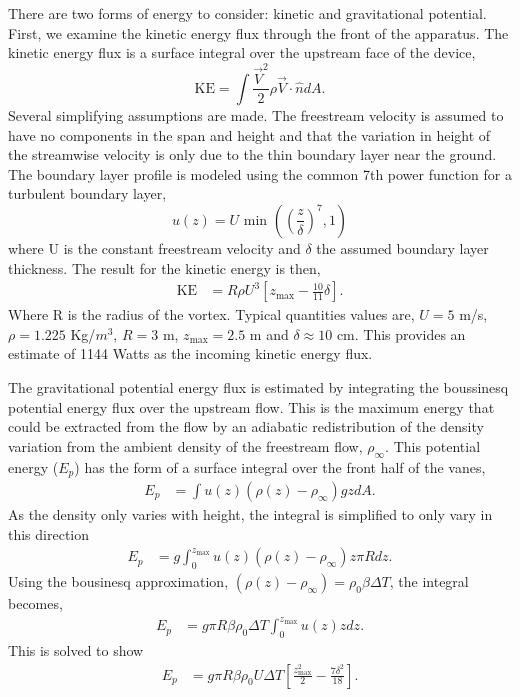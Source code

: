 There are two forms of energy to consider: kinetic and gravitational
potential. First, we examine the kinetic energy flux through the front
of the apparatus. 
The kinetic energy flux is a surface integral over the upstream face of
the device,  
\begin{equation*}
\text{KE} = \int \frac{\vec V^2}{2} \rho \vec V \cdot \hat n dA.
\end{equation*}
%
%
Several simplifying assumptions are made. The freestream 
velocity is assumed to have no components in the span and height and
that the variation in height of the streamwise
velocity is only due to the thin boundary layer near the
ground. The boundary layer profile is modeled using the common 7th
power function for a turbulent boundary layer,  
\begin{equation*}
  u(z) = U \text{ min }\left(\left(\frac{z}{\delta}\right)^7,1\right)
\end{equation*}
where U is the constant freestream velocity and $\delta$ the assumed
boundary layer thickness. 
The result for the kinetic energy is then, 
\begin{align*}
\text{KE} & = R \rho U^3 \left[ z_{\text{max}} - \frac{10}{11}\delta
\right].
\end{align*}
Where R is the radius of the vortex. Typical quantities values are, $U = 5$ m/s, $\rho =
1.225$ Kg/$m^3$, $R = 3$ m, $z_{\text{max}} = 2.5$ m and $\delta \approx
10$ cm. This provides an estimate of 1144 Watts as the incoming kinetic
energy flux. 

The gravitational potential energy flux is estimated by integrating the
boussinesq potential energy flux over the upstream flow. 
This is the maximum energy that could be extracted from the flow by an 
adiabatic redistribution of the density variation from the ambient 
density of the freestream flow, $\rho_\infty$. 
This potential energy ($E_p$) has the form of a surface integral over 
the front half of the vanes, 
\begin{align*}
  E_p & = \int u(z) (\rho(z)-\rho_\infty) g z dA. 
\end{align*}
As the density only varies with height, the integral is simplified to only vary in 
this direction
\begin{align*}
  E_p  & = g \int^{z_\text{max}}_0 u(z) (\rho(z)-\rho_\infty) z  \pi R dz.
\end{align*}
Using the bousinesq approximation, $(\rho(z)-\rho_\infty)  = \rho_0 \beta \Delta T$,
the integral becomes, 
\begin{align*}
  E_p & = g  \pi R \beta \rho_0 \Delta T \int^{z_\text{max}}_0 u(z) z dz.
\end{align*}
This is solved to show
\begin{align*}
  E_p & = g  \pi R \beta \rho_0 U \Delta T \left[ \frac{z_\text{max}^2}{2} - \frac{7 \delta^2}{18} \right].
\end{align*}

